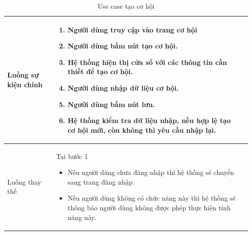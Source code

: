 \documentclass[12pt,a4paper]{article}
\begin{document}
\begin{table}[H]
\begin{tabular}{|p{3.5cm}|p{11.5cm}|c|}
            Luồng sự kiện chính & \vspace{-.8cm}\begin{enumerate}
                                                    \item Người dùng truy cập vào trang cơ hội
                                                    \item  Người dùng bấm nút tạo cơ hội.
                                                    \item  Hệ thống hiện thị cửa sổ với các thông tin cần thiết để tạo cơ hội.
                                                    \item  Người dùng nhập dữ liệu cơ hội.
                                                    \item Người dùng bấm nút lưu.
                                                    \item Hệ thống kiểm tra dữ liệu nhập, nếu hợp lệ tạo cơ hội mới, còn không thì yêu cầu nhập lại.
            \end{enumerate}
            \\
            \hline
            Luồng thay thế & Tại bước 1\newline
            \vspace{-.8cm}\begin{itemize}
                              \item Nếu người dùng chưa đăng nhập thì hệ thống sẽ chuyển sang trang đăng nhập.
                              \item  Nếu người dùng không có chức năng này thì hệ thống sẽ thông báo người dùng không được phép thực hiện tính năng này.
            \end{itemize}
            \\
            \hline
        \end{tabular}
        \caption{Use case tạo cơ hội}
    \end{table}


\end{document}
